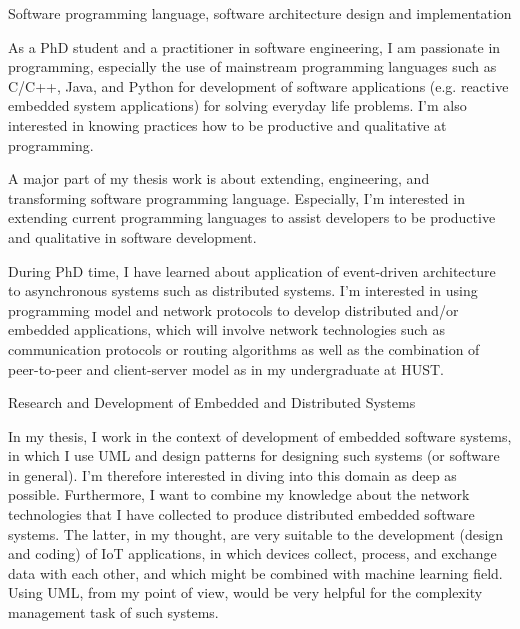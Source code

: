 \begin{cventries}
\cvinterest
{Software programming language, software architecture design and implementation}
{
	\begin{cvitems}
		\item{As a PhD student and a practitioner in software engineering, I am passionate in programming, especially the use of mainstream programming languages such as C/C++, Java, and Python for development of software applications (e.g. reactive embedded system applications) for solving everyday life problems. I'm also interested in knowing practices how to be productive and qualitative at programming.}
		\item{A major part of my thesis work is about extending, engineering, and transforming software programming language. Especially, I'm interested in extending current programming languages to assist developers to be productive and qualitative in software development.}
		\item{During PhD time, I have learned about application of event-driven architecture to asynchronous systems such as distributed systems. I'm interested in using programming model and network protocols to develop distributed and/or embedded applications, which will involve network technologies such as communication protocols or routing algorithms as well as the combination of peer-to-peer and client-server model as in my undergraduate at HUST.}
	\end{cvitems}
}


\cvinterest
{Research and Development of Embedded and Distributed Systems}
{\begin{cvitems}
		\item{In my thesis, I work in the context of development of embedded software systems, in which I use UML and design patterns for designing such systems (or software in general). I'm therefore interested in diving into this domain as deep as possible. Furthermore, I want to combine my knowledge about the network technologies that I have collected to produce distributed embedded software systems. The latter, in my thought, are very suitable to the development (design and coding) of IoT applications, in which devices collect, process, and exchange data with each other, and which might be combined with machine learning field. Using UML, from my point of view, would be very helpful for the complexity management task of such systems.}
\end{cvitems}}



\end{cventries}
